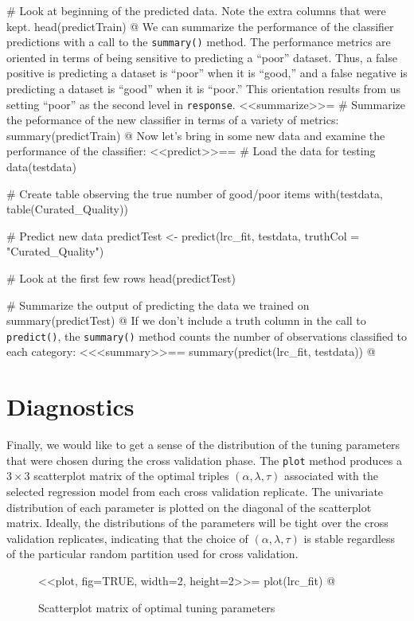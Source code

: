 \documentclass{article}
\begin{document}
# Look at beginning of the predicted data.  Note the extra columns that were kept.
head(predictTrain)
@ 
\noindent We can summarize the performance of the classifier predictions with a call to the {\tt summary()} method.
The performance metrics are oriented in terms of being sensitive to predicting a ``poor'' dataset.  Thus, a 
false positive is predicting a dataset is ``poor'' when it is ``good,'' and a false negative is predicting a 
dataset is ``good'' when it is ``poor.''  This orientation results from us setting ``poor'' as the second
level in {\tt response}.
<<summarize>>=
# Summarize the peformance of the new classifier in terms of a variety of metrics:
summary(predictTrain)
@
\noindent Now let's bring in some new data and examine the performance of the classifier:
<<predict>>==
# Load the data for testing
data(testdata)

# Create table observing the true number of good/poor items 
with(testdata, table(Curated_Quality))

# Predict new data
predictTest <- predict(lrc_fit, testdata, truthCol = "Curated_Quality")

# Look at the first few rows
head(predictTest)

# Summarize the output of predicting the data we trained on 
summary(predictTest)
@ 
\noindent If we don't include a truth column in the call to {\tt predict()}, the {\tt summary()} method 
counts the number of observations classified to each category:
<<<summary>>==
summary(predict(lrc_fit, testdata))
@ 


\section{Diagnostics}

\noindent Finally, we would like to get a sense of the distribution of the tuning parameters that were chosen 
during the cross validation phase. The {\tt plot} method produces a $3 \times 3$ scatterplot matrix of the optimal 
triples $\left(\alpha, \lambda, \tau\right)$ associated with the selected regression model from each cross 
validation replicate. The univariate distribution of each parameter is plotted on the diagonal of the 
scatterplot matrix.  Ideally, the distributions of the parameters will be tight over the cross validation 
replicates, indicating that the choice of $\left(\alpha, \lambda, \tau\right)$ is stable regardless of
the particular random partition used for cross validation.

\begin{figure}[H]
\begin{center}
<<plot, fig=TRUE, width=2, height=2>>=
plot(lrc_fit)
@
\caption{Scatterplot matrix of optimal tuning parameters}
\end{center}
\end{figure}
\end{document}
